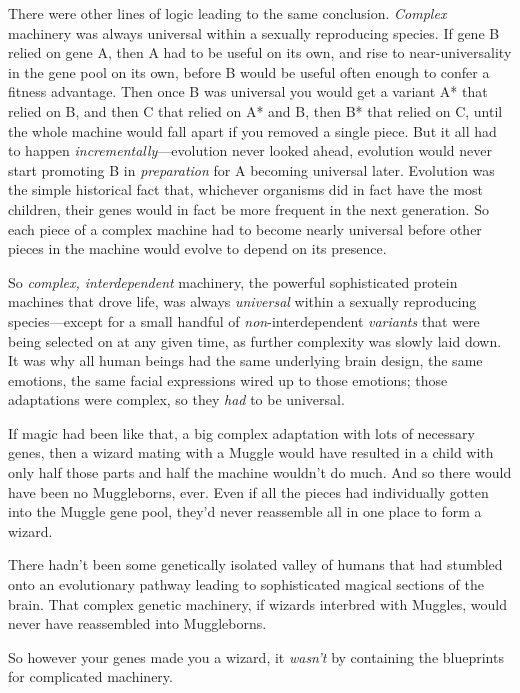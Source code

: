 There were other lines of logic leading to the same conclusion. \emph{Complex} 
machinery was always universal within a sexually reproducing species. If gene B 
relied on gene A, then A had to be useful on its own, and rise to 
near-universality in the gene pool on its own, before B would be useful often 
enough to confer a fitness advantage. Then once B was universal you would get a 
variant A* that relied on B, and then C that relied on A* and B, then B* that 
relied on C, until the whole machine would fall apart if you removed a single 
piece. But it all had to happen \emph{incrementally}---evolution never looked 
ahead, evolution would never start promoting B in \emph{preparation} for A 
becoming universal later. Evolution was the simple historical fact that, 
whichever organisms did in fact have the most children, their genes would in 
fact be more frequent in the next generation. So each piece of a complex 
machine had to become nearly universal before other pieces in the machine would 
evolve to depend on its presence.

So \emph{complex, interdependent} machinery, the powerful sophisticated protein 
machines that drove life, was always \emph{universal} within a sexually 
reproducing species---except for a small handful of \emph{non}-interdependent 
\emph{variants} that were being selected on at any given time, as further 
complexity was slowly laid down. It was why all human beings had the same 
underlying brain design, the same emotions, the same facial expressions wired 
up to those emotions; those adaptations were complex, so they \emph{had} to be 
universal.

If magic had been like that, a big complex adaptation with lots of necessary 
genes, then a wizard mating with a Muggle would have resulted in a child with 
only half those parts and half the machine wouldn't do much. And so there would 
have been no Muggleborns, ever. Even if all the pieces had individually gotten 
into the Muggle gene pool, they'd never reassemble all in one place to form a 
wizard.

There hadn't been some genetically isolated valley of humans that had stumbled 
onto an evolutionary pathway leading to sophisticated magical sections of the 
brain. That complex genetic machinery, if wizards interbred with Muggles, would 
never have reassembled into Muggleborns.

So however your genes made you a wizard, it \emph{wasn't} by containing the 
blueprints for complicated machinery.

